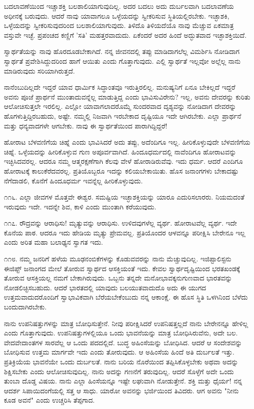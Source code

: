 ಬದಲಾವಣೆಯಿಂದ ಇಚ್ಚಾಶಕ್ತಿ ಬಲಶಾಲಿಯಾಗುವುದಿಲ್ಲ. ಅದರ ಬದಲು ಅದು ದುರ್ಬಲವಾಗಿ ಬದಲಾವಣೆಯ ಅಧೀನಕ್ಕೆ ಬರುವುದು. ಆದರೆ ನಾವು ಯಾವಾಗಲೂ ಒಳ್ಳೆಯದನ್ನು ಸ್ವೀಕರಿಸುವ ಸ್ಥಿತಿಯಲ್ಲಿರಬೇಕು. ಇಚ್ಛಾಶಕಿ, ಒಳ್ಳೆಯದನ್ನು ಸ್ವೀಕರಿಸುವುದರಿಂದ ಬಲಶಾಲಿಯಾಗುವುದು. ತಿಳಿದೊ ತಿಳಿಯದೆಯೊ ನಾವು ಮೆಚ್ಚುವ ಏಕಮಾತ್ರ ವಸ್ತುವೇ ಇಚ್ಛೆ. ಪ್ರಪಂಚದ ಕಣ್ಣಿಗೆ 'ಸತಿ' ಮಹತ್ತರವಾದುದು. ಏಕೆಂದರೆ ಅದರ ಹಿಂದೆ ಅದ್ಭುತವಾದ ಇಚ್ಛಾಶಕ್ತಿಯಿದೆ.

ಸ್ವಾರ್ಥತೆಯನ್ನು ನಾವು ಹೊರದೂಡಬೇಕಾಗಿದೆ. ನನ್ನ ಜೀವನದಲ್ಲಿ ತಪ್ಪು ಮಾಡಿದಾಗಲೆಲ್ಲ ವಿಮರ್ಶಿಸಿ ನೋಡಿದಾಗ ಸ್ವಾರ್ಥತೆ ಪ್ರವೇಶಿಸಿದ್ದುದರಿಂದ ಹಾಗೆ ಆಯಿತು ಎಂದು ಗೊತ್ತಾಗುವುದು. ಎಲ್ಲಿ ಸ್ವಾರ್ಥತೆ ಇಲ್ಲವೋ ಅಲ್ಲೆಲ್ಲ ನಾನು ಮಾಡಿರುವುದು ಸರಿಯಾಗಿರುತ್ತದೆ.

ನಾನೆಂಬುದಿಲ್ಲದೇ ಇದ್ದರೆ ಯಾವ ಧಾರ್ಮಿಕ ಸಿದ್ಧಾಂತವೂ ಇರುತ್ತಿರಲಿಲ್ಲ. ಮನುಷ್ಯನಿಗೆ ಏನೂ ಬೇಕಿಲ್ಲದೆ ಇದ್ದರೆ ಅವನು ಪೂಜೆ ಪ್ರಾರ್ಥನೆ ಮುಂತಾದುವನ್ನೆಲ್ಲ ಮಾಡುತ್ತಿದ್ದ ಎಂದು ಭಾವಿಸುವಿರೇನು? ಇಲ್ಲ, ಅವನು ದೇವರನ್ನು ಕುರಿತು ಆಲೋಚಿಸುತ್ತಲೇ ಇರಲಿಲ್ಲ. ಎಲ್ಲೋ ಯಾವಾಗಲಾದರೊಮ್ಮೆ ಸುಂದರವಾದ ದೃಶ್ಯವನ್ನು ನೋಡಿದಾಗ ದೇವರನ್ನು ಹೊಗಳುತ್ತಿದ್ದಿರಬಹುದು, ಅಷ್ಟೇ. ನಮ್ಮಲ್ಲಿ ನಿಜವಾಗಿ ಇರಬೇಕಾದ ದೃಷ್ಟಿಯೂ ಇದೇ ಆಗಿರಬೇಕು. ಎಲ್ಲಾ ಪ್ರಾರ್ಥನೆ ಮತ್ತು ಧನ್ಯವಾದಗಳೇ ಆಗಬೇಕು. ನಾವು ಈ ಸ್ವಾರ್ಥತೆಯಿಂದ ಪಾರಾಗಿದ್ದಿದ್ದರೆ!

ಹೋರಾಟ ಬೆಳವಣಿಗೆಯ ಚಿಹ್ನೆ ಎಂದು ಭಾವಿಸಿದರೆ ಅದು ತಪ್ಪು, ಅದೆಂದಿಗೂ ಇಲ್ಲ. ಹೀರಿಕೊಳ್ಳುವುದೇ ಬೆಳವಣಿಗೆಯ ಚಿಹ್ನೆ. ಒಳ್ಳೆಯದನ್ನು ಹೀರಿಕೊಳ್ಳುವ ಗುಣ ಅಪೂರ್ವವಾಗಿದೆ. ಹಿಂದೂಧರ್ಮದಲ್ಲಿ ನಾವೆಂದಿಗೂ ಹೋರಾಟವನ್ನು ಇಚ್ಛಿಸಿದವರಲ್ಲ. ಆದರೂ ನಮ್ಮ ಆತ್ಮರಕ್ಷಣೆಗಾಗಿ ಕೆಲವು ವೇಳೆ ಹೋರಾಡಿರುವೆವು. ಇದು ಧರ್ಮ. ಆದರೆ ಎಂದಿಗೂ ಹೋರಾಟಕ್ಕೆ ಕಾಲುಕೆರೆದವರಲ್ಲ. ಪ್ರತಿಯೊಬ್ಬರೂ ಇದನ್ನು ಕಲಿಯಬೇಕಾಯಿತು. ಹೊಸ ಜನಾಂಗಗಳು ಬೇಕಾದಷ್ಟು ನೆಗೆದಾಡಲಿ, ಕೊನೆಗೆ ಹಿಂದೂಧರ್ಮ ಇವನ್ನೆಲ್ಲ ಹೀರಿಕೊಳ್ಳುವುದು.

೧೧೬. ಎಲ್ಲಾ ಜೀವಗಳ ಮೊತ್ತವೇ ಈಶ್ವರ. ಸಮಷ್ಟಿಯ ಇಚ್ಛಾಶಕ್ತಿಯನ್ನು ಯಾರೂ ಎದುರಿಸಲಾರರು. ನಿಯಮದಂತೆ ಇರುವುದು ಇದೇ. ಇದನ್ನೇ ಶಿವ, ಕಾಳಿ ಎಂದು ಮುಂತಾಗಿ ಕರೆಯುವುದು.

೧೧೭. ರೌದ್ರವನ್ನು ಆರಾಧಿಸು! ಮೃತ್ಯುವನ್ನು ಆರಾಧಿಸು. ಉಳಿದವುಗಳೆಲ್ಲ ವ್ಯರ್ಥ. ಹೋರಾಟವೆಲ್ಲ ವ್ಯರ್ಥ. ಇದೇ ಕೊನೆಯ ಪಾಠ. ಆದರೂ ಇದು ಹೇಡಿಯ ಮೃತ್ಯು ಪ್ರೇಮವಲ್ಲ. ಪ್ರತಿಯೊಂದರ ಆಳವನ್ನೂ ಪರೀಕ್ಷಿಸಿ ಬೇರೇನೂ ಇಲ್ಲ ಎಂದು ಅರಿತ ಮಹಾ ಬಲಾಢ್ಯನ ಸ್ವಾಗತ ಇದು.

೧೧೮. ನಮ್ಮ ಜನರಿಗೆ ಹಳೆಯ ಮೂಢನಂಬಿಕೆಗಳನ್ನು ಕೊಡುವವರನ್ನು ನಾನು ಮೆಚ್ಚುವುದಿಲ್ಲ. ಇಜಿಪ್ಟಾಲಿಸ್ಟನು ಈಜಿಪ್ಟ್ ಜನಾಂಗದ ಮೇಲೆ ತೋರುವ ಸ್ವಾರ್ಥದ ಆಸಕ್ತಿಯಂತೆ ಇದು. ಕೇವಲ ಸ್ವಾರ್ಥದೃಷ್ಟಿಯಿಂದ ಭರತಖಂಡಕ್ಕೆ ತೋರುವ ಆಸಕ್ತಿಯಲ್ಲ ನಮಗೆ ಬೇಕಾಗಿರುವುದು. ಒಬ್ಬನು ತನ್ನದೇ ಮನೋಭಾವಕ್ಕನುಗುಣವಾದ ಭಾರತವನ್ನು ನೋಡಲಿಚ್ಛಿಸಬಹುದು. ಆದರೆ ಭಾರತದಲ್ಲಿ ಯಾವುದು ಬಲಯುತವಾದುದೊ ಅದು ಈ ಯುಗದ ಉತ್ತಮವಾದುದರೊಂದಿಗೆ ಸ್ವಾಭಾವಿಕವಾಗಿ ಬೆರೆಯಬೇಕೆಂಬುದು ನನ್ನ ಆಕಾಂಕ್ಷೆ. ಈ ಹೊಸ ಸ್ಥಿತಿ ಒಳಗಿನಿಂದ ಬೆಳೆದು ಬಂದುದಾಗಿರಬೇಕು.

ನಾನು ಉಪನಿಷತ್ತುಗಳನ್ನು ಮಾತ್ರ ಬೋಧಿಸುತ್ತೇನೆ. ನೀವು ಪರೀಕ್ಷಿಸಿದರೆ ಉಪನಿಷತ್ತಲ್ಲದೆ ನಾನು ಬೇರೇನನ್ನೂ ಹೇಳಿಲ್ಲ ಎಂದು ಗೊತ್ತಾಗುವುದು. ಉಪನಿಷತ್ತುಗಳಲ್ಲಿಯೂ ಒಂದು ಭಾವನೆಯನ್ನು ಮಾತ್ರ ಬೋಧಿಸಿರುವೆನು, ಅದೇ ಬಲ. ವೇದವೇದಾಂತಗಳ ಸಾರವೆಲ್ಲ ಆ ಒಂದು ಪದದಲ್ಲಿದೆ. ಬುದ್ಧ ಅಹಿಂಸೆಯನ್ನು ಬೋಧಿಸಿದ. ಆದರೆ ಆ ಸಂದೇಶವನ್ನು ಬೋಧಿಸುವ ಉತ್ತಮ ಮಾರ್ಗವೇ ಇದು ಎಂದು ತೋರುವುದು. ಆ ಅಹಿಂಸೆಯ ಹಿಂದೆ ಅತಿ ದುರ್ಬಲತೆ ಇತ್ತು. ಪ್ರತಿಕ್ರಿಯೆಯ ಭಾವನೆಯೇ ಒಂದು ದುರ್ಬಲತೆ. ನಾನು ಬರಿಯ ನೊರೆಯಿಂದ ತಪ್ಪಿಸಿಕೊಳ್ಳಬೇಕು ಅಥವಾ ಅದನ್ನು ಶಿಕ್ಷಿಸಬೇಕು ಎಂದು ಆಲೋಚಿಸುವುದಿಲ್ಲ. ನಾನು ಅದನ್ನು ಗಣನೆಗೆ ತರುವುದಿಲ್ಲ. ಆದರೆ ಸೊಳ್ಳೆಗೆ ಅದೇ ಒಂದು ತುಂಬಾ ದೊಡ್ಡ ವಿಷಯ. ನಾನು ಎಲ್ಲಾ ಹಿಂಸೆಯನ್ನೂ ಇಷ್ಟೇ ಲಘುವಾಗಿ ನೋಡುತ್ತೇನೆ. ಶಕ್ತಿ ಮತ್ತು ಧೈರ್ಯ! ನನ್ನ ಆದರ್ಶ ಸಿಪಾಯಿದಂಗೆಯಲ್ಲಿ ಸತ್ತ ಆ ಸಾಧು. ಯಾರೋ ಅವನನ್ನು ಭರ್ಜಿಯಿಂದ ತಿವಿದರು. ಆಗ ಅವನು "ನೀನು ಕೂಡ ಅವನೆ" ಎಂದು ಉಚ್ಚರಿಸಿ ತೆಪ್ಪಗಾದ.

